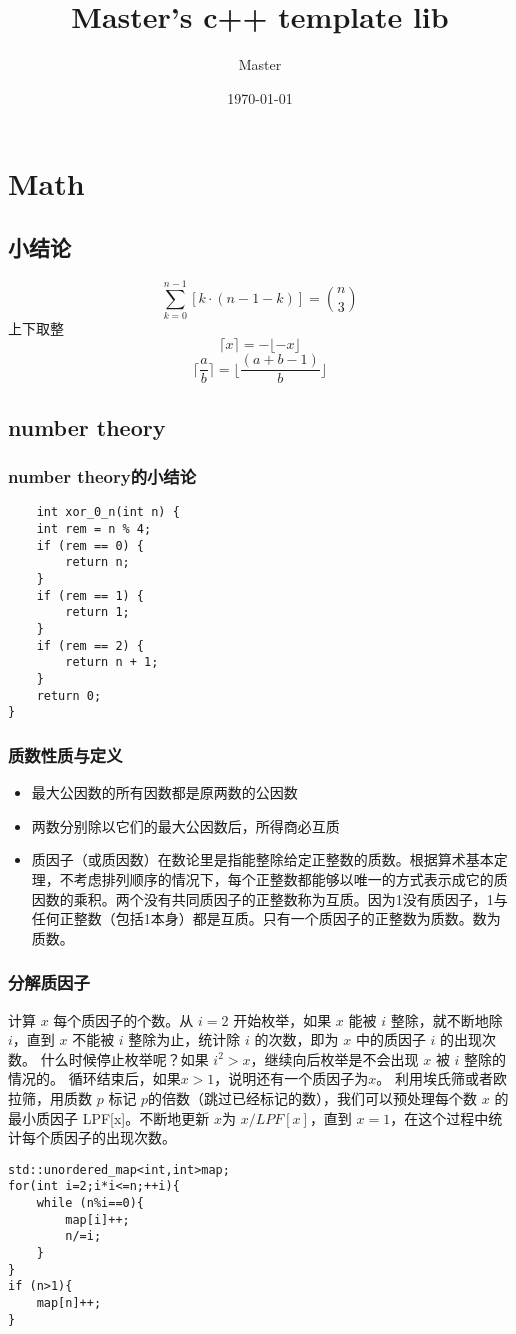 \documentclass[UTF8]{ctexart}
\title{Master's c++ template lib}
\author{Master}
\date{\today}
\begin{document}
\begin{titlepage}
    \maketitle
\end{titlepage}
\tableofcontents
\section{Math}
\subsection{小结论}
\[
\sum_{k=0}^{n-1} \left[ k \cdot (n-1-k) \right] = \binom{n}{3}
\]
上下取整
\[
\lceil x \rceil = - \lfloor - x \rfloor
\]
\[
\lceil \frac{a}{b} \rceil =\lfloor \frac{(a+b-1)}{b} \rfloor
\]
\subsection{number theory}
\subsubsection{number theory的小结论}
\begin{lstlisting}
    int xor_0_n(int n) {
    int rem = n % 4;
    if (rem == 0) {
        return n;
    }
    if (rem == 1) {
        return 1;
    }
    if (rem == 2) {
        return n + 1;
    }
    return 0;
}
\end{lstlisting}
\subsubsection{质数性质与定义}
\begin{itemize}
    \item 最大公因数的所有因数都是原两数的公因数
    \item 两数分别除以它们的最大公因数后，所得商必互质
    \item 质因子（或质因数）在数论里是指能整除给定正整数的质数。根据算术基本定理，不考虑排列顺序的情况下，每个正整数都能够以唯一的方式表示成它的质因数的乘积。两个没有共同质因子的正整数称为互质。因为1没有质因子，1与任何正整数（包括1本身）都是互质。只有一个质因子的正整数为质数。数为质数。
\end{itemize}
\subsubsection{分解质因子}
计算 $x$ 每个质因子的个数。从 $i=2$ 开始枚举，如果 $x$ 能被 $i$ 整除，就不断地除 $i$，直到 $x$ 不能被 $i$ 整除为止，统计除 $i$ 的次数，即为 $x$ 中的质因子 $i$ 的出现次数。
什么时候停止枚举呢？如果 $i ^2>x$，继续向后枚举是不会出现 $x$ 被 $i$ 整除的情况的。
循环结束后，如果$ x>1$，说明还有一个质因子为$ x$。
利用埃氏筛或者欧拉筛，用质数 $p$ 标记 $p$的倍数（跳过已经标记的数），我们可以预处理每个数 $x$ 的最小质因子 LPF[x]。不断地更新 $x $为  $x/LPF[x] $，直到 $x=1$，在这个过程中统计每个质因子的出现次数。
\begin{lstlisting}
std::unordered_map<int,int>map;
for(int i=2;i*i<=n;++i){
    while (n%i==0){
        map[i]++;
        n/=i;
    }
}
if (n>1){
    map[n]++;
}
\end{lstlisting}
\end{document}

